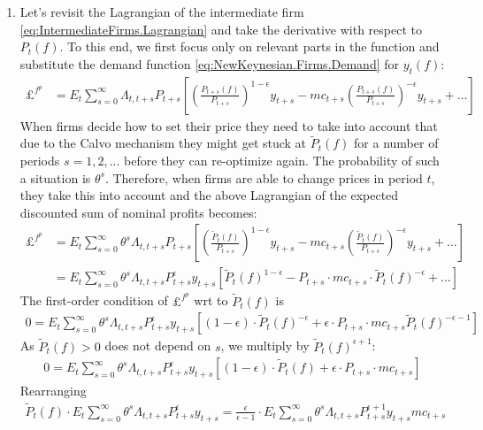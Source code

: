 \begin{enumerate}
\item Let's revisit the Lagrangian of the intermediate firm \eqref{eq:IntermediateFirms.Lagrangian}
  and take the derivative with respect to $P_t(f)$.
To this end, we first focus only on relevant parts in the function and
  substitute the demand function \eqref{eq:NewKeynesian.Firms.Demand} for $y_t(f)$:
\begin{align}
\pounds^{f^p} &= E_t \sum_{s=0}^{\infty}\Lambda_{t,t+s} P_{t+s} \left[
  \left(\frac{P_{t+s}(f)}{P_{t+s}}\right)^{1-\epsilon} y_{t+s}
  - mc_{t+s} \left(\frac{P_{t+s}(f)}{P_{t+s}}\right)^{-\epsilon} y_{t+s}
  + \dots
  \right]
\label{eq:Firms.Lagrangian}
\end{align}
When firms decide how to set their price they need to take into account
that due to the Calvo mechanism they might get stuck at $\widetilde{P}_t(f)$ for a number of periods $s=1,2,...$
before they can re-optimize again.
The probability of such a situation is $\theta^s$.
Therefore, when firms are able to change prices in period $t$,
they take this into account and the above Lagrangian of the expected discounted sum of nominal profits becomes:
\begin{align*}
\pounds^{f^p} &= E_t \sum_{s=0}^{\infty}\theta^s \Lambda_{t,t+s} P_{t+s}\left[ \left(\frac{\widetilde{P}_{t}(f)}{P_{t+s}}\right)^{1-\epsilon} y_{t+s} - mc_{t+s} \left(\frac{\widetilde{P}_{t}(f)}{P_{t+s}}\right)^{-\epsilon} y_{t+s} + \dots \right]\\
&= E_t \sum_{s=0}^{\infty}\theta^s \Lambda_{t,t+s} P_{t+s}^\epsilon y_{t+s} \left[ \widetilde{P}_{t}(f)^{1-\epsilon}  - P_{t+s} \cdot mc_{t+s} \cdot \widetilde{P}_{t}(f)^{-\epsilon} + ... \right]
\end{align*}
The first-order condition of $\pounds^{f^p}$ wrt to $\widetilde{P}_t(f)$ is
\begin{align*}
0= E_t \sum_{s=0}^{\infty}\theta^s \Lambda_{t,t+s} P_{t+s}^\epsilon y_{t+s} \left[ (1-\epsilon)\cdot \widetilde{P}_{t}(f)^{-\epsilon}  +\epsilon \cdot P_{t+s} \cdot mc_{t+s} \widetilde{P}_{t}(f)^{-\epsilon-1}\right]
\end{align*}
As $\widetilde{P}_t(f)>0$ does not depend on $s$, we multiply by $\widetilde{P}_t(f)^{\epsilon+1}$:
\begin{align*}
0= E_t \sum_{s=0}^{\infty}\theta^s \Lambda_{t,t+s} P_{t+s}^{\epsilon} y_{t+s} \left[ (1-\epsilon)\cdot\widetilde{P}_t(f) +\epsilon \cdot P_{t+s} \cdot mc_{t+s}  \right]
\end{align*}
Rearranging
\begin{align*}
\widetilde{P}_t(f) \cdot E_t \sum_{s=0}^{\infty}\theta^s \Lambda_{t,t+s} P_{t+s}^{\epsilon} y_{t+s}  = \frac{\epsilon}{\epsilon-1} \cdot E_t \sum_{s=0}^{\infty}\theta^s \Lambda_{t,t+s} P_{t+s}^{\epsilon+1} y_{t+s} mc_{t+s}

\end{align*}
\end{enumerate}
